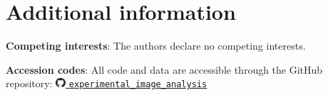 \documentclass[fleqn,10pt]{wlscirep}
\begin{document}
\section*{Additional information}
\textbf{Competing interests}: The authors declare no competing interests.

\noindent \textbf{Accession codes}: All code and data are accessible through the GitHub repository: \href{https://github.com/JeroFotinos/experimental_image_analysis}{\includegraphics[width=1em]{images/github-mark.pdf} \nolinkurl{experimental_image_analysis}}


%
\end{document}
